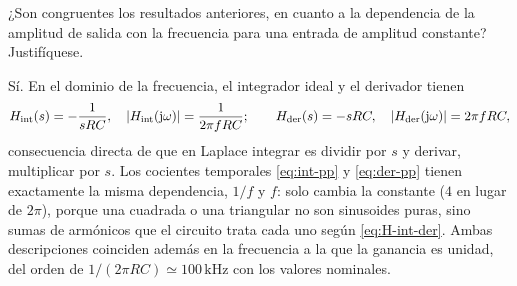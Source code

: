 \begin{pregunta}
¿Son congruentes los resultados anteriores, en cuanto a la dependencia de la amplitud de salida con la
frecuencia para una entrada de amplitud constante? Justifíquese.
\end{pregunta}

\begin{respuesta}
Sí. En el dominio de la frecuencia, el integrador ideal y el derivador tienen
\begin{equation}\label{eq:H-int-der}
  H_{\mathrm{int}}(s)=-\frac{1}{sRC},\quad \lvert H_{\mathrm{int}}(\mathrm{j}\omega)\rvert=\frac{1}{2\pi fRC};\qquad
  H_{\mathrm{der}}(s)=-sRC,\quad \lvert H_{\mathrm{der}}(\mathrm{j}\omega)\rvert=2\pi fRC ,
\end{equation}
consecuencia directa de que en Laplace integrar es dividir por $s$ y derivar, multiplicar por $s$. Los cocientes
temporales \eqref{eq:int-pp} y \eqref{eq:der-pp} tienen exactamente la misma dependencia, $1/f$ y $f$: solo cambia
la constante ($4$ en lugar de $2\pi$), porque una cuadrada o una triangular no son sinusoides puras, sino sumas de
armónicos que el circuito trata cada uno según \eqref{eq:H-int-der}. Ambas descripciones coinciden además en la
frecuencia a la que la ganancia es unidad, del orden de $1/(2\pi RC)\simeq100\,\mathrm{kHz}$ con los valores nominales.
\end{respuesta}
